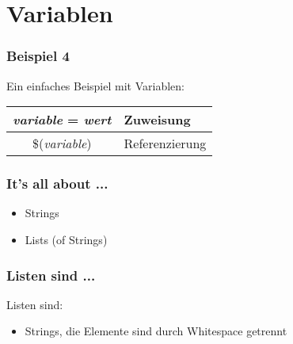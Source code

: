 \section{Variablen}
\begin{frame}
	\frametitle{Beispiel 4}
    Ein einfaches Beispiel mit Variablen:
      
 
  \begin{tabular}{|c|l|}
    \hline
    \textit{variable} = \textit{wert} & Zuweisung \\ \hline 
    \$(\textit{variable}) & Referenzierung \\ \hline
  \end{tabular}
\end{frame}

\begin{frame}
	\frametitle{It's all about ...}
	\begin{itemize}
    \item<2-> \huge{Strings}
    \item<3-> \huge{Lists (of Strings)}
    \end{itemize}
\end{frame}

\begin{frame}
	\frametitle{Listen sind ...}
    \begin{Large}
	Listen sind:
    \begin{itemize}
    \item<2-> Strings, die Elemente sind durch Whitespace getrennt
    \end{itemize}
    \end{Large}
\end{frame}

